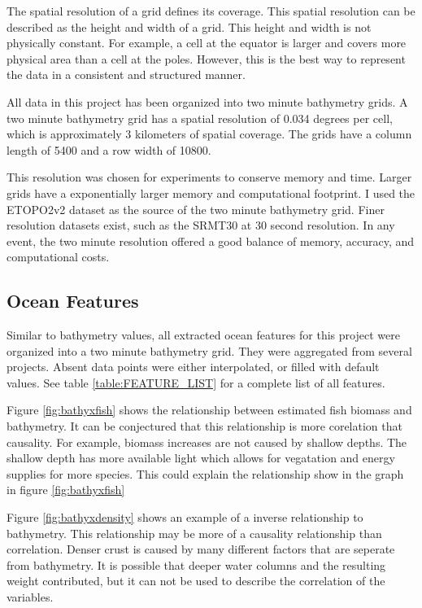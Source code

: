 \par
The spatial resolution of a grid defines its coverage.
This spatial resolution can be described as the height and width of a grid.
This height and width is not physically constant.
For example, a cell at the equator is larger and covers more physical area than a cell at the poles.
However, this is the best way to represent the data in a consistent and structured manner.

\par
All data in this project has been organized into two minute bathymetry grids.
A two minute bathymetry grid has a spatial resolution of 0.034 degrees per cell, which is approximately 3 kilometers of spatial coverage.
The grids have a column length of 5400 and a row width of 10800.

\par
This resolution was chosen for experiments to conserve memory and time.
Larger grids have a exponentially larger memory and computational footprint.
I used the \ac{ETOPO}2v2 \cite{national1988etopo} dataset as the source of the two minute bathymetry grid.
Finer resolution datasets exist, such as the SRMT30 \cite{becker2009global} at 30 second resolution.
In any event, the two minute resolution offered a good balance of memory, accuracy, and computational costs.

\subsection{Ocean Features}
Similar to bathymetry values, all extracted ocean features for this project were organized into a two minute bathymetry grid.
They were aggregated from several projects.
Absent data points were either interpolated, or filled with default values.
See table \ref{table:FEATURE_LIST} for a complete list of all features.

\par
Figure \ref{fig:bathyxfish} shows the relationship between estimated fish biomass and bathymetry.
It can be conjectured that this relationship is more corelation that causality.
For example, biomass increases are not caused by shallow depths.
The shallow depth has more available light which allows for vegatation and energy supplies for more species.
This could explain the relationship show in the graph in figure \ref{fig:bathyxfish}


\par
Figure \ref{fig:bathyxdensity} shows an example of a inverse relationship to bathymetry.
This relationship may be more of a causality relationship than correlation.
Denser crust is caused by many different factors that are seperate from bathymetry.
It is possible that deeper water columns and the resulting weight contributed, but it can not be used to describe the correlation of the variables.

